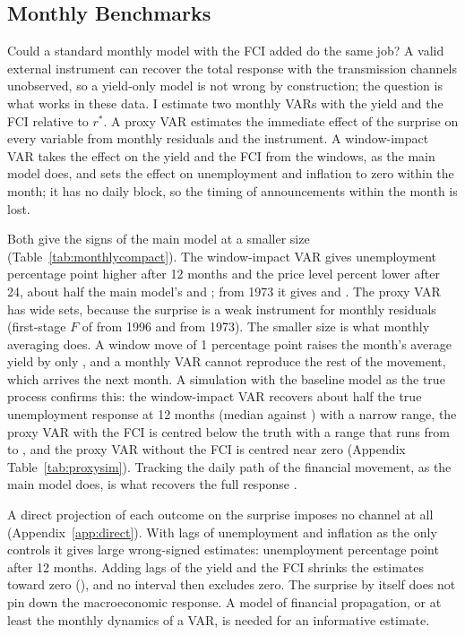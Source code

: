 \documentclass[11pt]{article}
\newcommand{\rs}{r^{*}}
\begin{document}
\subsection{Monthly Benchmarks}\label{sec:monthlyvar}
Could a standard monthly model with the FCI added do the same job? A valid external instrument can recover the total response with the transmission channels unobserved, so a yield-only model is not wrong by construction; the question is what works in these data. I estimate two monthly VARs with the yield and the FCI relative to $\rs$. A proxy VAR estimates the immediate effect of the surprise on every variable from monthly residuals and the instrument. A window-impact VAR takes the effect on the yield and the FCI from the windows, as the main model does, and sets the effect on unemployment and inflation to zero within the month; it has no daily block, so the timing of announcements within the month is lost.



Both give the signs of the main model at a smaller size (Table~\ref{tab:monthlycompact}). The window-impact VAR gives unemployment  percentage point higher after 12 months and the price level  percent lower after 24, about half the main model's  and ; from 1973 it gives  and . The proxy VAR has wide sets, because the surprise is a weak instrument for monthly residuals (first-stage $F$ of  from 1996 and  from 1973). The smaller size is what monthly averaging does. A window move of 1 percentage point raises the month's average yield by only , and a monthly VAR cannot reproduce the rest of the movement, which arrives the next month. A simulation with the baseline model as the true process confirms this: the window-impact VAR recovers about half the true unemployment response at 12 months (median  against ) with a narrow range, the proxy VAR with the FCI is centred below the truth with a range that runs from  to , and the proxy VAR without the FCI is centred near zero (Appendix Table~\ref{tab:proxysim}). Tracking the daily path of the financial movement, as the main model does, is what recovers the full response \citep{jacobson2026}.

A direct projection of each outcome on the surprise imposes no channel at all (Appendix~\ref{app:direct}). With lags of unemployment and inflation as the only controls it gives large wrong-signed estimates: unemployment  percentage point after 12 months. Adding lags of the yield and the FCI shrinks the estimates toward zero (), and no interval then excludes zero. The surprise by itself does not pin down the macroeconomic response. A model of financial propagation, or at least the monthly dynamics of a VAR, is needed for an informative estimate.
\end{document}
